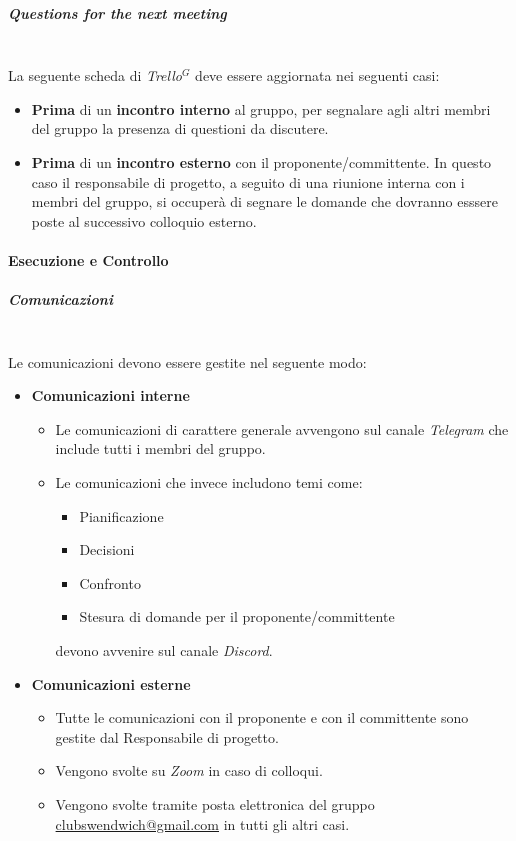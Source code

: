 \subparagraph{Questions for the next meeting}
\mbox{}\\
La seguente scheda di \textit{Trello}$^G$ deve essere aggiornata nei seguenti casi:
\begin{itemize}
    \item \textbf{Prima} di un \textbf{incontro interno} al gruppo, per segnalare agli altri membri del gruppo
    la presenza di questioni da discutere.
    \item \textbf{Prima} di un \textbf{incontro esterno} con il proponente/committente. In questo caso il responsabile
    di progetto, a seguito di una riunione interna con i membri del gruppo, si occuperà di segnare le
    domande che dovranno esssere poste al successivo colloquio esterno.
\end{itemize}

\paragraph{Esecuzione e Controllo}

\subparagraph{Comunicazioni}
\mbox{}\\

Le comunicazioni devono essere gestite nel seguente modo:
\begin{itemize}
    \item \textbf{Comunicazioni interne}
    \begin{itemize}
        \item Le comunicazioni di carattere generale avvengono sul canale \textit{Telegram}
        che include tutti i membri del gruppo.
        \item Le comunicazioni che invece includono temi come:
        \begin{itemize}
            \item Pianificazione
            \item Decisioni
            \item Confronto
            \item Stesura di domande per il proponente/committente
        \end{itemize}
        devono avvenire sul canale \textit{Discord}.
    \end{itemize}
    \item \textbf{Comunicazioni esterne}
    \begin{itemize}
        \item Tutte le comunicazioni con il proponente e con il committente sono gestite dal Responsabile di progetto.
        \item Vengono svolte su \textit{Zoom} in caso di colloqui.
        \item Vengono svolte tramite posta elettronica del gruppo \href{mailto:clubswendwich@gmail.com}{clubswendwich@gmail.com} in tutti gli altri casi.
    \end{itemize}
\end{itemize}

